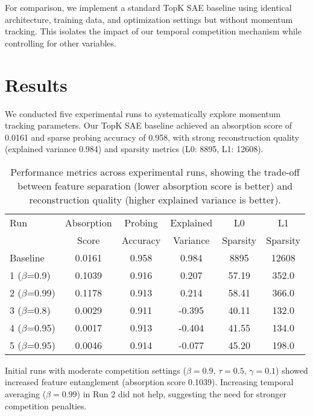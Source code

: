 \documentclass{article} %
\begin{document}
For comparison, we implement a standard TopK SAE baseline \cite{gaoScalingEvaluatingSparse} using identical architecture, training data, and optimization settings but without momentum tracking. This isolates the impact of our temporal competition mechanism while controlling for other variables.

\section{Results}
\label{sec:results}

We conducted five experimental runs to systematically explore momentum tracking parameters. Our TopK SAE baseline achieved an absorption score of 0.0161 and sparse probing accuracy of 0.958, with strong reconstruction quality (explained variance 0.984) and sparsity metrics (L0: 8895, L1: 12608).

\begin{table}[h]
\centering
\caption{Performance metrics across experimental runs, showing the trade-off between feature separation (lower absorption score is better) and reconstruction quality (higher explained variance is better).}
\label{tab:results}
\begin{tabular}{lccccc}
\toprule
Run & Absorption & Probing & Explained & L0 & L1 \\
& Score & Accuracy & Variance & Sparsity & Sparsity \\
\midrule
Baseline & 0.0161 & 0.958 & 0.984 & 8895 & 12608 \\
1 ($\beta$=0.9) & 0.1039 & 0.916 & 0.207 & 57.19 & 352.0 \\
2 ($\beta$=0.99) & 0.1178 & 0.913 & 0.214 & 58.41 & 366.0 \\
3 ($\beta$=0.8) & 0.0029 & 0.911 & -0.395 & 40.11 & 132.0 \\
4 ($\beta$=0.95) & 0.0017 & 0.913 & -0.404 & 41.55 & 134.0 \\
5 ($\beta$=0.95) & 0.0046 & 0.914 & -0.077 & 45.20 & 198.0 \\
\bottomrule
\end{tabular}
\end{table}

Initial runs with moderate competition settings ($\beta=0.9$, $\tau=0.5$, $\gamma=0.1$) showed increased feature entanglement (absorption score 0.1039). Increasing temporal averaging ($\beta=0.99$) in Run 2 did not help, suggesting the need for stronger competition penalties.
\end{document}
